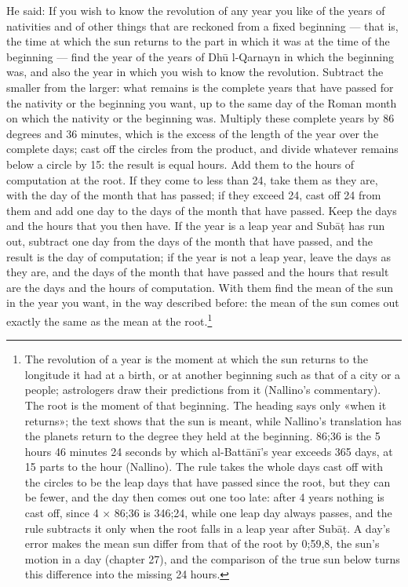 \documentclass[11pt]{article}
\newcommand{\ArPage}[1]{\marginpar{\footnotesize\color{gray}Ar.\,p.\,#1}}
\begin{document}
\par \ArPage{193}He said: If you wish to know the revolution of any year you like of the years of nativities and of other things that are reckoned from a fixed beginning — that is, the time at which the sun returns to the part in which it was at the time of the beginning — find the year of the years of Dhū l-Qarnayn in which the beginning was, and also the year in which you wish to know the revolution. Subtract the smaller from the larger: what remains is the complete years that have passed for the nativity or the beginning you want, up to the same day of the Roman month on which the nativity or the beginning was. Multiply these complete years by 86 degrees and 36 minutes, which is the excess of the length of the year over the complete days; cast off the circles from the product, and divide whatever remains below a circle by 15: the result is equal hours. Add them to the hours of computation at the root. If they come to less than 24, take them as they are, with the day of the month that has passed; if they exceed 24, cast off 24 from them and add one day to the days of the month that have passed. Keep the days and the hours that you then have. If the year is a leap year and Subāṭ has run out, subtract one day from the days of the month that have passed, and the result is the day of computation; if the year is not a leap year, leave the days as they are, and the days of the month that have passed and the hours that result are the days and the hours of computation. With them find the mean of the sun in the year you want, in the way described before: the mean of the sun comes out exactly the same as the mean at the root.\footnote{The revolution of a year is the moment at which the sun returns to the longitude it had at a birth, or at another beginning such as that of a city or a people; astrologers draw their predictions from it (Nallino's commentary). The root is the moment of that beginning. The heading says only «when it returns»; the text shows that the sun is meant, while Nallino's translation has the planets return to the degree they held at the beginning. 86;36 is the 5 hours 46 minutes 24 seconds by which al-Battānī's year exceeds 365 days, at 15 parts to the hour (Nallino). The rule takes the whole days cast off with the circles to be the leap days that have passed since the root, but they can be fewer, and the day then comes out one too late: after 4 years nothing is cast off, since 4 × 86;36 is 346;24, while one leap day always passes, and the rule subtracts it only when the root falls in a leap year after Subāṭ. A day's error makes the mean sun differ from that of the root by 0;59,8, the sun's motion in a day (chapter 27), and the comparison of the true sun below turns this difference into the missing 24 hours.}\par
\end{document}
